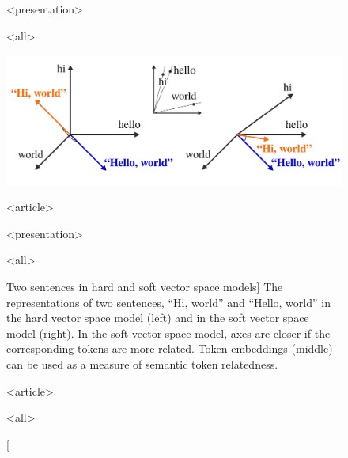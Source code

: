\begin{figure}

\mode
<presentation>

\vspace*{-0.9cm}

\mode
<all>

\centering
\includegraphics{soft-vsm}

\mode
<article>

\vspace{-0.4cm}

\mode
<presentation>

\vspace{-0.6cm}

\mode
<all>

\caption
  [Two sentences in hard and soft vector space models]%
  {The representations of two sentences, ``Hi, world'' and ``Hello,
   world'' in the hard vector space model (left) and in the soft vector space
   model (right). In the soft vector space model, axes are closer if the
   corresponding tokens are more related. Token embeddings (middle) can be used
   as a measure of semantic token relatedness.
   \cite[Figure 6]{novotny2020three}}

\mode
<article>

\label{fig:soft-vsm}

\mode
<all>

\end{figure}
